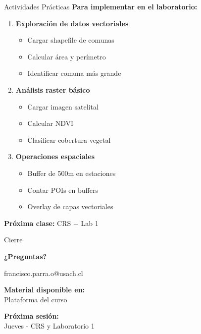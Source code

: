 \documentclass[10pt,aspectratio=169]{beamer}
\begin{document}
\begin{frame}{Actividades Prácticas}
    \footnotesize
    \textbf{Para implementar en el laboratorio:}
    
    \begin{enumerate}
        \item \textbf{Exploración de datos vectoriales}
        \begin{itemize}
            \footnotesize
            \item Cargar shapefile de comunas
            \item Calcular área y perímetro
            \item Identificar comuna más grande
        \end{itemize}
        
        \item \textbf{Análisis raster básico}
        \begin{itemize}
            \footnotesize
            \item Cargar imagen satelital
            \item Calcular NDVI
            \item Clasificar cobertura vegetal
        \end{itemize}
        
        \item \textbf{Operaciones espaciales}
        \begin{itemize}
            \footnotesize
            \item Buffer de 500m en estaciones
            \item Contar POIs en buffers
            \item Overlay de capas vectoriales
        \end{itemize}
    \end{enumerate}
    
    \textbf{Próxima clase:} CRS + Lab 1
\end{frame}

\begin{frame}{Cierre}
    \begin{center}
        \vspace{1cm}
        {\Large \textbf{¿Preguntas?}}
        
        \vspace{1cm}
        
        francisco.parra.o@usach.cl
        
        \vspace{0.8cm}
        
        \textbf{Material disponible en:}\\
        Plataforma del curso
        
        \vspace{0.6cm}
        
        \textbf{Próxima sesión:}\\
        Jueves - CRS y Laboratorio 1
    \end{center}
\end{frame}
\end{document}
